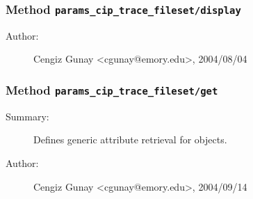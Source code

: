 \subsubsection[Method \texttt{display}]{Method \texttt{params\_cip\_trace\_fileset/display}}%
%
\label{ref_params_cip_trace_fileset__display}%
\hypertarget{ref_params_cip_trace_fileset__display}{}%
\begin{description}
%
%
%
%
%
%
%
\item[Author:]%
Cengiz Gunay <cgunay@emory.edu>, 2004/08/04
%
\end{description}
\methodline%
\subsubsection[Method \texttt{get}]{Method \texttt{params\_cip\_trace\_fileset/get}}%
%
\label{ref_params_cip_trace_fileset__get}%
\hypertarget{ref_params_cip_trace_fileset__get}{}%
\begin{description}
\item[Summary:]Defines generic attribute retrieval for objects.
%
%
%
%
%
%
%
\item[Author:]%
Cengiz Gunay <cgunay@emory.edu>, 2004/09/14
%
\end{description}
\methodline%
